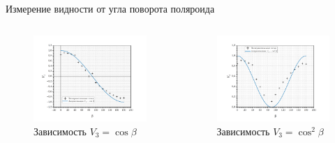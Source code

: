 \documentclass[11pt]{beamer} %
\begin{document}
    \begin{frame}{Измерение видности от угла поворота поляроида}
        \begin{columns}
            \begin{figure}[H]
            \centering
                \includegraphics[width = \textwidth]{images/v3_cos_betta.png}
                \caption{Зависимость $V_3 = \cos \beta$}
            \end{figure}

            \begin{figure}[H]
            \centering
                \includegraphics[width = \textwidth]{images/v3_coscos_betta.png}
                \caption{Зависимость $V_3 = \cos^2 \beta$}
            \end{figure}
        \end{columns}
    \end{frame}
\end{document}
